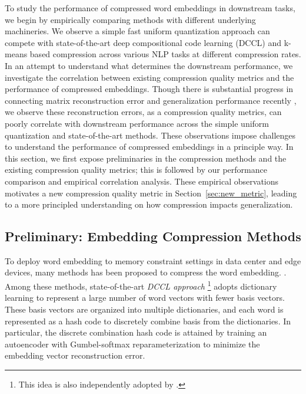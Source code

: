To study the performance of compressed word embeddings in downstream tasks, we begin by empirically comparing methods with different underlying machineries. We observe a simple fast uniform quantization approach can compete with state-of-the-art deep compositional code learning (DCCL) \citep{dccl17} and k-means based compression \citep{andrews16} across various NLP tasks at different compression rates. In an attempt to understand what determines the downstream performance, we investigate the correlation between existing compression quality metrics and the performance of compressed embeddings. Though there is substantial progress in connecting matrix reconstruction error and generalization performance recently \citep{yin18,avron17,lprff18}, we observe these reconstruction errors, as a compression quality metrics, can poorly correlate with downstream performance across the simple uniform quantization and state-of-the-art methods. These observations impose challenges to understand the performance of compressed embeddings in a principle way. In this section, we first expose preliminaries in the compression methods and the existing compression quality metrics; this is followed by our performance comparison and empirical correlation analysis. These empirical observations motivates a new compression quality metric in Section~\ref{sec:new_metric}, leading to a more principled understanding on how compression impacts generalization.

\subsection{Preliminary: Embedding Compression Methods}
\label{subsec:prel}
To deploy word embedding to memory constraint settings in data center and edge devices, many methods has been proposed to compress the word embedding. . Among these methods, state-of-the-art \emph{DCCL approach} \citep{dccl17}\footnote{This idea is also independently adopted by \citet{kway18}.} adopts dictionary learning to represent a large number of word vectors with fewer basis vectors. These basis vectors are organized into multiple dictionaries, and each word is represented as a hash code to discretely combine basis from the dictionaries. In particular, the discrete combination hash code is attained by training an autoencoder with Gumbel-softmax reparameterization \citep{maddison2016concrete,jang2016categorical} to minimize the embedding vector reconstruction error. 

